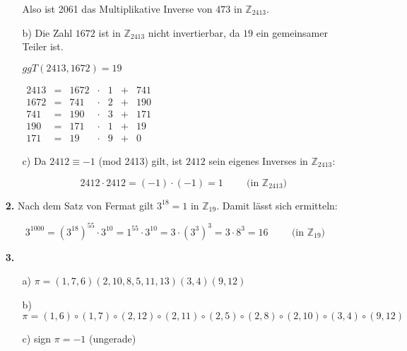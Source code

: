 \documentclass[a4paper,10pt]{scrartcl}
\begin{document}
\begin{enumerate}
\begin{enumerate}
                Also ist 2061 das Multiplikative Inverse von $473$ in $\mathbb{Z}_{2413}$.

            \item[b)]
                Die Zahl $1672$ ist in $\mathbb{Z}_{2413}$ nicht invertierbar, da $19$ ein gemeinsamer Teiler ist.

                $ggT(2413, 1672) = 19$

                $\begin{array}{rcrclcl}
                    2413 &=& 1672 &\cdot&  1 &+& 741 \\
                    1672 &=&  741 &\cdot&  2 &+& 190 \\
                    741  &=&  190 &\cdot&  3 &+& 171 \\
                    190  &=&  171 &\cdot&  1 &+& 19  \\
                    171  &=&   19 &\cdot&  9 &+& 0
                \end{array}$

            \item[c)]
                Da $2412 \equiv -1$ (mod 2413) gilt, ist $2412$ sein eigenes Inverses in $\mathbb{Z}_{2413}$:

                $$2412 \cdot 2412 = (-1) \cdot (-1) = 1 \hspace{1cm}\text{(in }\mathbb{Z}_{2413}\text{)}$$
        \end{enumerate}

    \item[\textbf{2.}]
        Nach dem Satz von Fermat gilt $3^{18} = 1$ in $\mathbb{Z}_{19}$. Damit lässt sich ermitteln:

        $$3^{1000} = (3^{18})^{55} \cdot 3^{10} = 1^{55} \cdot 3^{10} = 3 \cdot (3^3)^3 = 3 \cdot 8^3 = 16 \hspace{1cm}\text{(in }\mathbb{Z}_{19}\text{)}$$

    \item[\textbf{3.}]
        \begin{enumerate}
            \item[a)]
                $\pi = (1,7,6)(2,10,8,5,11,13)(3,4)(9,12)$

            \item[b)]
                $\pi = (1,6)\circ(1,7)\circ(2,12)\circ(2,11)\circ(2,5)\circ(2,8)\circ(2,10)\circ(3,4)\circ(9,12)$

            \item[c)]
                sign $\pi = -1$ (ungerade)
        \end{enumerate}


\end{enumerate}
\end{document}
